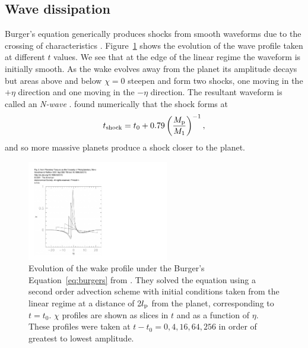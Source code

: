 \subsection{Wave dissipation}

Burger's equation generically produces shocks from smooth waveforms due to the crossing of characteristics \citep{whitham1999}.
Figure~\ref{fig:wake_profiles_GR01} shows the evolution of the wave profile taken at different $t$ values.
We see that at the edge of the linear regime the waveform is initially smooth.
As the wake evolves away from the planet its amplitude decays but areas above and below $\chi=0$ steepen and form two shocks, one moving in the $+\eta$ direction and one moving in the $-\eta$ direction.
The resultant waveform is called an \textit{N-wave} \citep{landau1987}.
\citet{goodman2001} found numerically that the shock forms at 
\begin{align}
    t_{\rm shock} = t_0 + 0.79 \left( \frac{M_{\rm p}}{M_1} \right)^{-1},
\end{align}
and so more massive planets produce a shock closer to the planet.

\begin{figure}
    \centering
    \includegraphics[width = 0.55\textwidth]{figures/wake_profiles_GR01.pdf}
    \caption{Evolution of the wake profile under the Burger's Equation~\eqref{eq:burgers} from \citet{goodman2001}.
    They solved the equation using a second order advection scheme with initial conditions taken from the linear regime at a distance of 2$l_{\rm p}$ from the planet, corresponding to $t=t_0$.
    $\chi$ profiles are shown as slices in $t$ and as a function of $\eta$.
    These profiles were taken at $t-t_0 = 0, 4, 16, 64, 256$ in order of greatest to lowest amplitude.}
    \label{fig:wake_profiles_GR01}
\end{figure}

